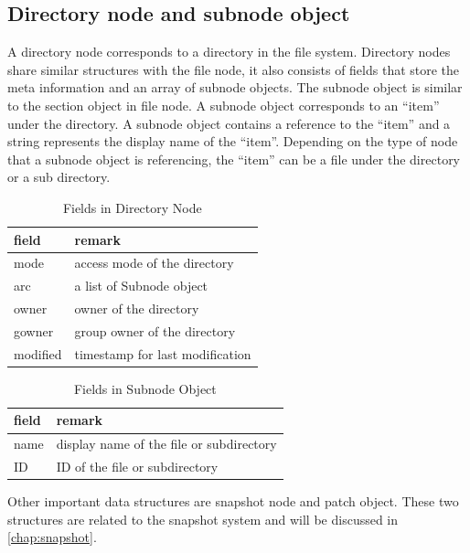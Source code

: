 \subsection{Directory node and subnode object}

     A directory node corresponds to a directory in the file system. Directory nodes share similar structures with the file node, it also consists of fields that store the meta information and an array of subnode objects. The subnode object is similar to the section object in file node. A subnode object corresponds to an ``item'' under the directory. A subnode object contains a reference to the ``item'' and a string represents the display name of the ``item''. Depending on the type of node that a subnode object is referencing, the ``item'' can be a file under the directory or a sub directory.

\begin{table}
\caption{Fields in Directory Node}
\label{tab:dir_fields}
\begin{center}
\begin{tabular}{ll}
\toprule
field & remark\\
\midrule
mode & access mode of the directory\\
arc & a list of Subnode object\\
owner & owner of the directory\\
gowner & group owner of the directory\\
modified & timestamp for last modification\\
\bottomrule
\end{tabular}
\end{center}
\end{table}

\begin{table}
\caption{Fields in Subnode Object}
\label{tab:subnode_fields}
\begin{center}
\begin{tabular}{ll}
\toprule
field & remark\\
\midrule
name & display name of the file or subdirectory\\
ID & ID of the file or subdirectory\\
\bottomrule
\end{tabular}
\end{center}
\end{table}

    Other important data structures are snapshot node and patch object. These two structures are related to the snapshot system and will be discussed in \cref{chap:snapshot}.

